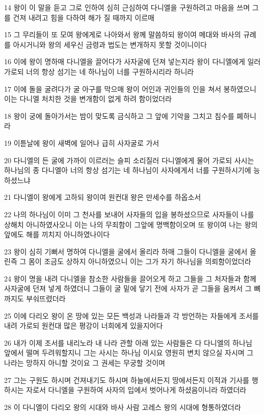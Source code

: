 \par 14 왕이 이 말을 듣고 그로 인하여 심히 근심하여 다니엘을 구원하려고 마음을 쓰며 그를 건져 내려고 힘을 다하여 해가 질 때까지 이르매
\par 15 그 무리들이 또 모여 왕에게로 나아와서 왕께 말씀하되 왕이여 메대와 바사의 규례를 아시거니와 왕의 세우신 금령과 법도는 변개하지 못할 것이니이다
\par 16 이에 왕이 명하매 다니엘을 끌어다가 사자굴에 던져 넣는지라 왕이 다니엘에게 일러 가로되 너의 항상 섬기는 네 하나님이 너를 구원하시리라 하니라
\par 17 이에 돌을 굴려다가 굴 아구를 막으매 왕이 어인과 귀인들의 인을 쳐서 봉하였으니 이는 다니엘 처치한 것을 변개함이 없게 하려 함이었더라
\par 18 왕이 궁에 돌아가서는 밤이 맞도록 금식하고 그 앞에 기악을 그치고 침수를 폐하니라
\par 19 이튿날에 왕이 새벽에 일어나 급히 사자굴로 가서
\par 20 다니엘의 든 굴에 가까이 이르러는 슬피 소리질러 다니엘에게 물어 가로되 사시는 하나님의 종 다니엘아 너의 항상 섬기는 네 하나님이 사자에게서 너를 구원하시기에 능하셨느냐
\par 21 다니엘이 왕에게 고하되 왕이여 원컨대 왕은 만세수를 하옵소서
\par 22 나의 하나님이 이미 그 천사를 보내어 사자들의 입을 봉하셨으므로 사자들이 나를 상해치 아니하였사오니 이는 나의 무죄함이 그앞에 명백함이오며 또 왕이여 나는 왕의 앞에도 해를 끼치지 아니하였나이다
\par 23 왕이 심히 기뻐서 명하여 다니엘을 굴에서 올리라 하매 그들이 다니엘을 굴에서 올린즉 그 몸이 조금도 상하지 아니하였으니 이는 그가 자기 하나님을 의뢰함이었더라
\par 24 왕이 명을 내려 다니엘을 참소한 사람들을 끌어오게 하고 그들을 그 처자들과 함께 사자굴에 던져 넣게 하였더니 그들이 굴 밑에 닿기 전에 사자가 곧 그들을 움켜서 그 뼈까지도 부숴뜨렸더라
\par 25 이에 다리오 왕이 온 땅에 있는 모든 백성과 나라들과 각 방언하는 자들에게 조서를 내려 가로되 원컨대 많은 평강이 너희에게 있을지어다
\par 26 내가 이제 조서를 내리노라 내 나라 관할 아래 있는 사람들은 다 다니엘의 하나님 앞에서 떨며 두려워할지니 그는 사시는 하나님 이시요 영원히 변치 않으실 자시며 그 나라는 망하지 아니할 것이요 그 권세는 무궁할 것이며
\par 27 그는 구원도 하시며 건져내기도 하시며 하늘에서든지 땅에서든지 이적과 기사를 행하시는 자로서 다니엘을 구원하여 사자의 입에서 벗어나게 하셨음이니라 하였더라
\par 28 이 다니엘이 다리오 왕의 시대와 바사 사람 고레스 왕의 시대에 형통하였더라

